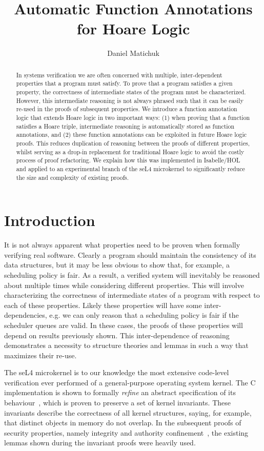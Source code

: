\documentclass[submission]{eptcs}
\title{Automatic Function Annotations for Hoare Logic}
\author{Daniel Matichuk
\institute{NICTA\\ Sydney, Australia}
\email{daniel.matichuk@nicta.com.au}
}
\begin{document}
\maketitle

\begin{abstract}
In systems verification we are often concerned
with multiple, inter-dependent properties that a program must
satisfy. To prove that a program satisfies a given property,
the correctness of intermediate states of the program must be
characterized. However, this intermediate reasoning is not
always phrased such that it can be easily re-used in the
proofs of subsequent properties. We introduce a function
annotation logic that extends Hoare logic in two important ways:
(1) when proving that a function satisfies a Hoare triple, intermediate
reasoning is automatically stored as function annotations, and (2) these function
annotations can be exploited in future Hoare logic proofs.
This reduces duplication of reasoning between the proofs of different properties, whilst
serving as a drop-in replacement for traditional Hoare logic to
avoid the costly process of proof refactoring. We explain
how this was implemented in Isabelle/HOL and applied to an
experimental branch of the seL4 microkernel to significantly reduce
the size and complexity of existing proofs.
\end{abstract}

\section{Introduction}
\label{s:intro}

It is not always apparent
what properties need to be proven when formally verifying real software. Clearly
a program should maintain the consistency of its data structures, but it may
be less obvious to show that, for example, a scheduling policy is fair.
As a result, a verified system will inevitably be reasoned about multiple
times while considering different properties. This will
involve characterizing the correctness of intermediate states of
a program with 
respect to each of these properties. Likely these properties will have
some inter-dependencies, e.g. we can only reason that a scheduling
policy is fair if the scheduler queues are valid. In these cases,
the proofs of these properties will depend on results previously shown.
This inter-dependence of reasoning demonstrates a necessity to
structure theories and lemmas in such a way that maximizes their re-use.

The seL4 microkernel is to our knowledge the most extensive
code-level verification ever performed of a general-purpose
operating system kernel. The C implementation is shown to formally
\emph{refine} an abstract specification of its behaviour~\cite{Klein_EHACDEEKNSTW_09}, which is proven to preserve a set of kernel invariants. These
 invariants describe the correctness of all kernel structures,
  saying, for example, that distinct objects in memory do not
  overlap. In the subsequent proofs of security properties, namely
integrity and authority confinement~\cite{Sewell_WGMAK}, the existing lemmas shown
during the invariant proofs were heavily used.
\end{document}
